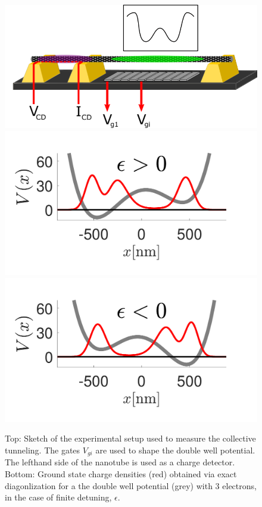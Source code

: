 \documentclass[prb,twocolumn,showpacs,preprintnumbers,amsmath,amssymb, superscriptaddress]{revtex4-2}
\newcommand{\1}{{1\hspace*{-0.5ex} \textrm{l} \hspace*{0.5ex}}}
\begin{document}
\begin{figure}[h!]
    \begin{center}
     \includegraphics[width=0.7\columnwidth]{Experimental_Setup.png}
     \vskip 10pt
     \includegraphics[width=0.49\columnwidth]{Fig_WaveFunction_Potential_NegEps_v1}
     \includegraphics[width=0.49\columnwidth]{Fig_WaveFunction_Potential_PosEps}
    \end{center}
    \caption{Top: Sketch of  the experimental setup used to measure the
	 collective tunneling. The gates  
	 $V_{gi}$ are used to shape the double well potential. 
	 The lefthand side of the nanotube is used as a charge detector. 
	 Bottom: Ground state charge densities  (red) obtained via exact diagonlization  for a the double well potential (grey) with 3 electrons, in the case of finite detuning, $\epsilon$.}
     \label{fig:experimental_setup}
\end{figure}
  
\end{document}
